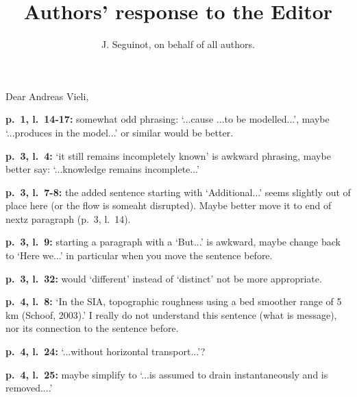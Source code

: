 

\title{Authors' response to the Editor}
\author{J. Seguinot, on behalf of all authors.}


\thispagestyle{empty}
\maketitle
\bigskip


    Dear Andreas Vieli,

    \newcommand{\referee}[1]{\bigskip\noindent\textcolor{journalname}{#1}}

    \referee{\textbf{p.~1, l.~14-17:}
        somewhat odd phrasing: `...cause ...to be modelled...', maybe
        `...produces in the model...' or similar would be better.}

    \referee{\textbf{p.~3, l.~4:}
        `it still remains incompletely known' is awkward phrasing, maybe better
        say: `...knowledge remains incomplete...'}

    \referee{\textbf{p.~3, l.~7-8:}
        the added sentence starting with `Additional...' seems slightly out of
        place here (or the flow is someaht disrupted). Maybe better move it to
        end of nextz paragraph (p.~3, l.~14).}

    \referee{\textbf{p.~3, l.~9:}
        starting a paragraph with a `But...' is awkward, maybe change back to
        `Here we...' in particular when you move the sentence before.}

    \referee{\textbf{p.~3, l.~32:}
        would `different' instead of `distinct' not be more appropriate.}

    \referee{\textbf{p.~4, l.~8:}
        `In the SIA, topographic roughness using a bed smoother range of 5 km
        (Schoof, 2003).' I really do not understand this sentence (what is
        message), nor its connection to the sentence before.}

    \referee{\textbf{p.~4, l.~24:}
        `...without horizontal transport...'?}

    \referee{\textbf{p.~4, l.~25:}
        maybe simplify to `...is assumed to drain instantaneously and is
        removed....'}

